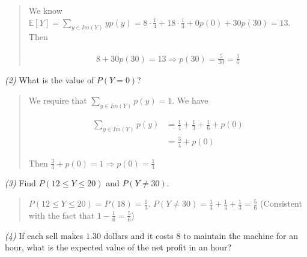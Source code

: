\documentclass[a4paper, 12pt]{article}
\begin{document}
\small
\begin{quote}

    We know $\mathbb{E}\left[ Y \right] = \sum_{y \in Im(Y)}yp(y) = 8\cdot
    \frac{1}{4} + 18\cdot \frac{1}{3} + 0p(0) + 30p(30) = 13$. Then 

    \begin{align*}
        8 + 30p(30) = 13 \Rightarrow p(30) = \frac{5}{30} = \frac{1}{6}
    \end{align*}

\end{quote}
\normalsize

\textit{(2)} What is the value of $P(Y = 0)$?


\small
\begin{quote}

    We require that $\sum_{y \in Im(Y)}p(y) = 1$. We have 

    \begin{align*}
        \sum_{y \in Im(Y)} p(y) &= \frac{1}{4} + \frac{1}{3} + \frac{1}{6} +
        p(0)\\ 
                                &= \frac{3}{4} + p(0)
    \end{align*}

    Then $\frac{3}{4} + p(0) = 1 \Rightarrow p(0) = \frac{1}{4}$

\end{quote}
\normalsize

\textit{(3)} Find $P(12 \leq Y \leq 20)$ and $P(Y \neq 30)$. 


\small
\begin{quote}

$P(12 \leq Y \leq 20) = P(18) = \frac{1}{3}$. $P(Y \neq 30) = \frac{1}{4} +
\frac{1}{4} + \frac{1}{3} = \frac{5}{6}$ (Consistent with the fact that $1 -
\frac{1}{6} = \frac{5}{6}$)

\end{quote}
\normalsize

\textit{(4)} If each sell makes $1.30$ dollars and it costs $8$ to maintain the
machine for an hour, what is the expected value of the net profit in an hour?
\end{document}
